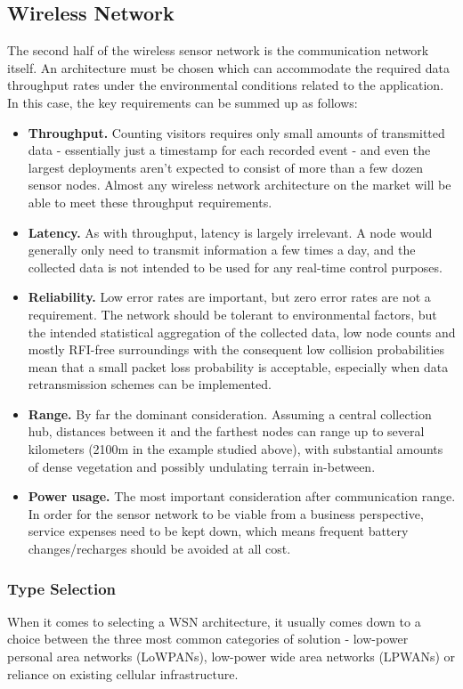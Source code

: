 \documentclass[10pt,nocopyrightspace]{ewsn-proc}
\begin{document}
\subsection{Wireless Network}
The second half of the wireless sensor network is the communication network itself. An architecture must be chosen which can accommodate the required data throughput rates under the environmental conditions related to the application. In this case, the key requirements can be summed up as follows:
\begin{itemize}
\item \textbf{Throughput.} Counting visitors requires only small amounts of transmitted data - essentially just a timestamp for each recorded event - and even the largest deployments aren’t expected to consist of more than a few dozen sensor nodes. Almost any wireless network architecture on the market will be able to meet these throughput requirements.
\item \textbf{Latency.} As with throughput, latency is largely irrelevant. A node would generally only need to transmit information a few times a day, and the collected data is not intended to be used for any real-time control purposes.
\item \textbf{Reliability.} Low error rates are important, but zero error rates are not a requirement. The network should be tolerant to environmental factors, but the intended statistical aggregation of the collected data, low node counts and mostly RFI-free surroundings with the consequent low collision probabilities mean that a small packet loss probability is acceptable, especially when data retransmission schemes can be implemented.
\item \textbf{Range.} By far the dominant consideration. Assuming a central collection hub, distances between it and the farthest nodes can range up to several kilometers (2100m in the example studied above), with substantial amounts of dense vegetation and possibly undulating terrain in-between. 
\item \textbf{Power usage.} The most important consideration after communication range. In order for the sensor network to be viable from a business perspective, service expenses need to be kept down, which means frequent battery changes/recharges should be avoided at all cost. 
\end{itemize}

\subsubsection{Type Selection}
When it comes to selecting a WSN architecture, it usually comes down to a choice between the three most common categories of solution - low-power personal area networks (LoWPANs), low-power wide area networks (LPWANs) or reliance on existing cellular infrastructure.
\end{document}
